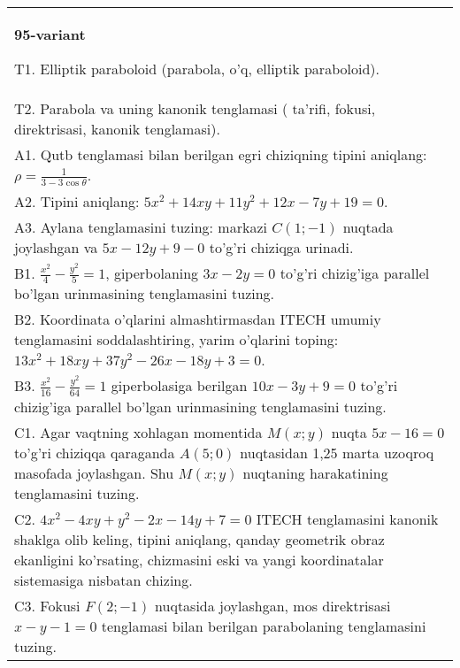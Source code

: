 \documentclass{article}
\begin{document}
\begin{tabular}{m{17cm}}
\textbf{95-variant}
\newline

T1. Elliptik paraboloid (parabola, o'q, elliptik paraboloid).\\

T2. Parabola va uning kanonik tenglamasi ( ta'rifi, fokusi, direktrisasi, kanonik tenglamasi).\\

A1. Qutb tenglamasi bilan berilgan egri chiziqning tipini aniqlang: $\rho=\frac{1}{3-3\cos\theta}$.\\

A2. Tipini aniqlang: $5x^{2}+14xy+11y^{2}+12x-7y+19=0$.\\

A3. Aylana tenglamasini tuzing: markazi $C(1;-1)$ nuqtada joylashgan va $5x-12y+9-0$ to'g'ri chiziqga urinadi.\\

B1. $\frac{x^{2}}{4} - \frac{y^{2}}{5} = 1$, giperbolaning $3x - 2y = 0$ to'g'ri chizig'iga parallel bo'lgan urinmasining tenglamasini tuzing.  \\

B2. Koordinata o'qlarini almashtirmasdan ITECH umumiy tenglamasini soddalashtiring, yarim o'qlarini toping: $13x^{2} + 18xy + 37y^{2} - 26x - 18y + 3 = 0$.  \\

B3. $\frac{x^{2}}{16} - \frac{y^{2}}{64} = 1$ giperbolasiga berilgan $10x - 3y + 9 = 0$ to'g'ri chizig'iga parallel bo'lgan urinmasining tenglamasini tuzing.  \\

C1. Agar vaqtning xohlagan momentida $M(x;y)$ nuqta $5x - 16 = 0$ to'g'ri chiziqqa qaraganda $A(5;0)$ nuqtasidan 1,25 marta uzoqroq masofada joylashgan. Shu $M(x;y)$ nuqtaning harakatining tenglamasini tuzing.  \\

C2. $4x^{2} - 4xy + y^{2} - 2x - 14y + 7 = 0$ ITECH tenglamasini kanonik shaklga olib keling, tipini aniqlang, qanday geometrik obraz ekanligini ko'rsating, chizmasini eski va yangi koordinatalar sistemasiga nisbatan chizing.  \\

C3. Fokusi $F(2; - 1)$ nuqtasida joylashgan, mos direktrisasi $x - y - 1 = 0$ tenglamasi bilan berilgan parabolaning tenglamasini tuzing.  \\

\end{tabular}
\vspace{1cm}
\end{document}
